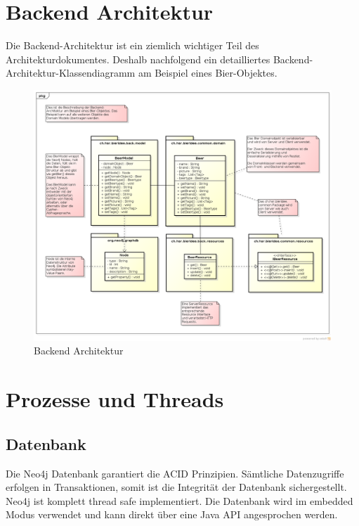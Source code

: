 \documentclass[10pt,a4paper]{scrartcl}
\begin{document}
\section{Backend Architektur}

Die Backend-Architektur ist ein ziemlich wichtiger Teil des Architekturdokumentes. Deshalb
nachfolgend ein detailliertes Backend-Architektur-Klassendiagramm am Beispiel eines Bier-Objektes.

\begin{figure}[H]
	\includegraphics[height=\textwidth,angle=90]{BackendArchitektur.png}
	\caption{Backend Architektur}
	\label{fig:backend_architecture}
\end{figure}


\section{Prozesse und Threads}

\subsection{Datenbank}

Die Neo4j Datenbank garantiert die ACID Prinzipien.
Sämtliche Datenzugriffe erfolgen in Transaktionen, somit ist die Integrität der Datenbank
sichergestellt.
Neo4j ist komplett thread safe implementiert.  Die Datenbank wird im
embedded Modus verwendet und kann direkt über eine Java API angesprochen werden.
\end{document}
